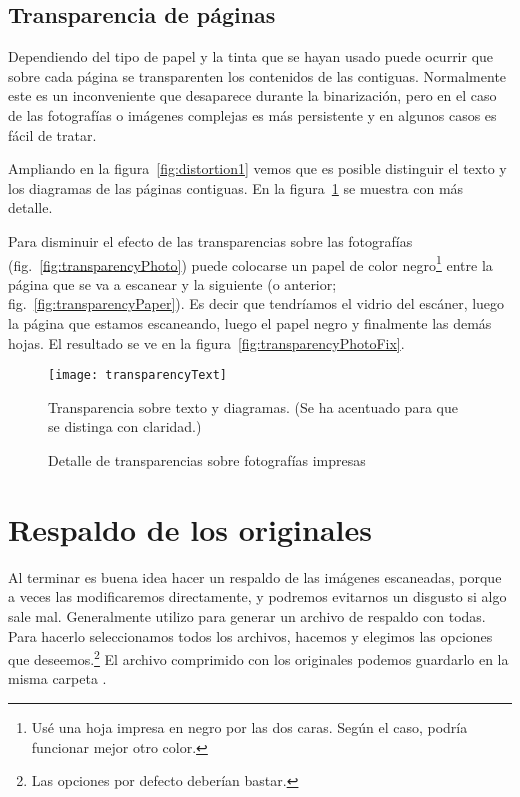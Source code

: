 \documentclass[%
	a5paper,
	10pt,
	twoside,
	openright,
	final,
]{memoir}
\begin{document}
	\subsection{Transparencia de páginas} Dependiendo del tipo de papel y la tinta que se hayan usado puede ocurrir que sobre cada página se transparenten los contenidos de las contiguas. Normalmente este es un inconveniente que desaparece durante la binarización, pero en el caso de las fotografías o imágenes complejas es más persistente y en algunos casos es fácil de tratar.

	Ampliando en la figura~\ref{fig:distortion1} vemos que es posible distinguir el texto y los diagramas de las páginas contiguas. En la figura~\ref{fig:transparencyText} se muestra con más detalle.

	Para disminuir el efecto de las transparencias sobre las fotografías (fig.~\ref{fig:transparencyPhoto}) puede colocarse un papel de color negro\footnote{Usé una hoja impresa en negro por las dos caras. Según el caso, podría funcionar mejor otro color.} entre la página que se va a escanear y la siguiente (o anterior; fig.~\ref{fig:transparencyPaper}). Es decir que tendríamos el vidrio del escáner, luego la página que estamos escaneando, luego el papel negro y finalmente las demás hojas. El resultado se ve en la figura~\ref{fig:transparencyPhotoFix}.

	\begin{figure}
		\texttt{[image: transparencyText]}
		\caption[Transparencia sobre texto y diagramas]{Transparencia sobre texto y diagramas. (Se ha acentuado para que se distinga con claridad.)\label{fig:transparencyText}}
	\end{figure}

	\begin{figure}
		\vspace{-1.11\onelineskip}
		\caption{Detalle de transparencias sobre fotografías impresas\label{fig:transparency}}
	\end{figure}

	\section{Respaldo de los originales\label{sec:scanOriginalBackup}} Al terminar es buena idea hacer un respaldo de las imágenes escaneadas, porque a veces las modificaremos directamente, y podremos evitarnos un disgusto si algo sale mal. Generalmente utilizo \szip para generar un archivo de respaldo con todas. Para hacerlo seleccionamos todos los archivos, hacemos  y elegimos las opciones que deseemos.\footnote{Las opciones por defecto deberían bastar.} El archivo comprimido con los originales podemos guardarlo en la misma carpeta .
\end{document}
